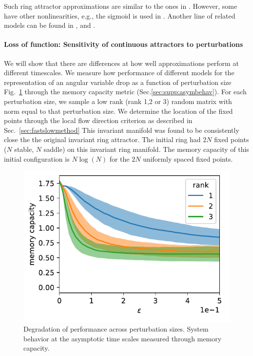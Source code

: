 \documentclass{article} %
\newcounter{ct}
\theoremstyle{definition}
\theoremstyle{remark}
\begin{document}
 Such ring attractor approximations are similar to the ones in \citep{goodridge2000, samsonovich1997path, redish1996coupled, tsodyks1995associative}. %
However, some have other nonlinearities, e.g.,  the sigmoid is used in \citep{goodridge2000}.
Another line of related models can be found in \citep{Burak2009}, \citep{couey2013} and \citep{spalla2021continuous}.



\paragraph{Loss of function: Sensitivity of continuous attractors to perturbations}\label{sec:supp:boa}
We will show that there are differences at how well approximations perform at different timescales.
We measure how performance of different models for the representation of an angular variable drop as a function of perturbation size Fig.~\ref{fig:performance} through the memory capacity metric (Sec.\ref{sec:supp:asymbehav}).
For each perturbation size, we sample a low rank (rank 1,2 or 3) random matrix with norm equal to that perturbation size.
We determine the location of the fixed points through the local flow direction criterion as described in Sec.~\ref{sec:fastslowmethod}
This invariant manifold was found to be consistently close the the original invariant ring attractor.
The initial ring had \(2N\) fixed points (\(N\) stable, \(N\) saddle) on this invariant ring manifold.
The memory capacity of this initial configuration is \(N\log(N)\) for the \(2N\) uniformly spaced fixed points.

\begin{figure}[tbhp]
  \centering
  \includegraphics[width=\textwidth]{performance2}
  \caption{Degradation of performance across perturbation sizes. System behavior at the asymptotic time scales measured through memory capacity. }\label{fig:performance}
\end{figure}
\end{document}
